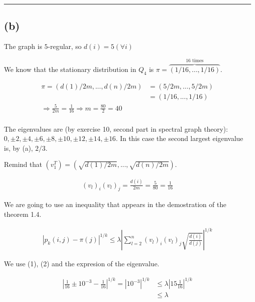 \documentclass{article}
\begin{document}

\noindent
{\color{gray} \rule{\linewidth}{0.5mm} }
\newpage

\subsection*{(b)}

\noindent The graph is $5$-regular, so $d(i) = 5 (\forall i)$

\noindent We know that the stationary distribution in $Q_4$ is $\pi = \overbrace{(1/16, ..., 1/16)}^{16 \text{ times}}$.

\begin{align}
     \nonumber \pi = (d(1)/2m, ..., d(n)/2m) & = (5/2m, ..., 5/2m) \\ \nonumber & = (1/16, ..., 1/16) \\  \Rightarrow \frac{5}{2m} = \frac{1}{16} \Rightarrow  m = \frac{80}{2} = 40\\ \nonumber
\end{align}

\noindent The eigenvalues are (by exercise 10, second part in spectral graph theory): $0, \pm 2, \pm 4, \pm 6, \pm 8, \pm 10, \pm 12, \pm 14, \pm 16$. In this case the second largest eigenvalue is, by (a), $2/3$.

\noindent Remind that $(v_{1}^{T}) = (\sqrt{d(1)/2m}, ..., \sqrt{d(n)/2m})$.

\begin{align}
     (v_l)_i (v_l)_j = \frac{d(i)}{2m} = \frac{5}{80} = \frac{1}{16}
\end{align}


\noindent We are going to use an inequality that appears in the demostration of the theorem 1.4.

\begin{align}
|p_{k}(i, j) - \pi(j) |^{1/k} \leq \lambda \left| \sum_{l = 2}^{n} (v_l)_i (v_l)_j \sqrt{\frac{d(i)}{d(j)}} \right| ^{1/k}    
\end{align}


\noindent We use (1), (2) and the expresion of the eigenvalue.

\begin{align}
    \nonumber \left| \frac{1}{16} \pm 10^{-3} - \frac{1}{16} \right|^{1/k} = \left|10^{-3} \right|^{1/k} & \leq \lambda \left| 15 \frac{1}{16} \right| ^{1/k} \\ \nonumber & \leq \lambda  \\ \nonumber
\end{align}
\end{document}

